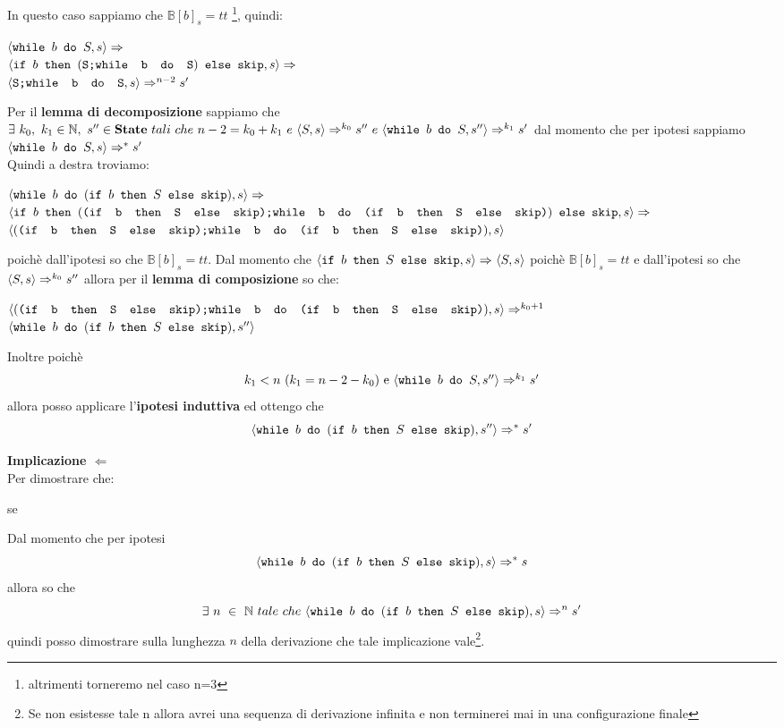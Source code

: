 {	 In questo caso sappiamo che $\mathbb{B}[b]_s=tt$
	\footnote{altrimenti torneremo nel caso n=3}, quindi:
	\begin{center}
	$\confSs{\wbS{b}{S}}{s}\Rar{}$\\
	$\confSs{
		\ifABC{b}
			{(\concat{S}{\wbS{b}{S}})}
			{\skipistr}
	}{s}\Rar{}$\\
	$\confSs{\concat{S}{\wbS{b}{S}}}{s}\Rar{n-2}s'$
	\end{center}
	Per il \textbf{lemma di decomposizione} sappiamo che 
	$\exists{}~k_0,~k_1\in\mathbb{N},~s''\in\states~tali~che~n-2=k_0+k_1~e~
	\confSs{S}{s}\Rar{k_0}s''~e~\confSs{\wbS{b}{S}}{s''}\Rar{k_1}s'$ dal
	momento che per ipotesi sappiamo $\confSs{\wbS{b}{S}}{s}\Rar{*}s'$\\
	Quindi a destra troviamo:
	\begin{center}
	$\confSs{\wbS{b}{(\ifABC{b}{S}{\skipistr})}}{s}\Rar{}$\\
	{\small
	$\confSs{
		\ifABC{b}
		{(\concat{(\ifABC{b}{S}{\skipistr})}
		{\wbS{b}{(\ifABC{b}{S}{\skipistr})}})}
		{\skipistr}}{s}\Rar{}$\\}
	$\confSs{
		{(\concat{(\ifABC{b}{S}{\skipistr})}
		{\wbS{b}{(\ifABC{b}{S}{\skipistr})}})}
	}{s}$
	\end{center}
	poichè dall'ipotesi so che $\mathbb{B}[b]_s=tt$. Dal momento che 
	$\confSs{\ifABC{b}{S}{\skipistr}}{s}\Rar{}\confSs{S}{s}$ poichè
	$\mathbb{B}[b]_s=tt$ e dall'ipotesi so che $\confSs{S}{s}\Rar{k_0}s''$
	allora per il \textbf{lemma di composizione} so che:
	\begin{center}
	$\confSs{
		{(\concat{(\ifABC{b}{S}{\skipistr})}
		{\wbS{b}{(\ifABC{b}{S}{\skipistr})}})}
	}{s}\Rar{k_0+1}$\\
	$\confSs{\wbS{b}{(\ifABC{b}{S}{\skipistr})}}{s''}$
	\end{center}
	Inoltre poichè \[ k_1<n~(k_1=n-2-k_0)$ e $\confSs{\wbS{b}{S}}{s''}\Rar{k_1}s' \]
	allora posso applicare l'\textbf{ipotesi induttiva} ed ottengo che
	\[ \confSs{\wbS{b}{(\ifABC{b}{S}{\skipistr})}}{s''}\Rar{*}s' \]

	\textbf{Implicazione $\Longleftarrow{}$} \\
	Per dimostrare che:
	\begin{center}
	se \exFourRtL{}
	\end{center}
	Dal momento che per ipotesi \[ \confSs{\wbS{b}
		{(\ifABC{b}{S}{\skipistr})}}{s}\Rar{*}s \] allora so che 
	\[ \exists{}~n~\in~\mathbb{N}~tale~che~\confSs{\wbS{b}
		{(\ifABC{b}{S}{\skipistr})}}{s}\Rar{n}s'  \]quindi
	posso dimostrare sulla lunghezza $n$ della derivazione che tale
	implicazione vale\footnote{Se non esistesse tale n allora avrei una sequenza 
	di derivazione infinita e non terminerei mai in una configurazione finale}.\\
    
}
